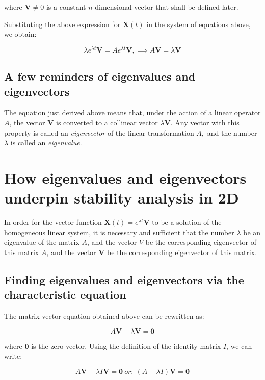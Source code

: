 where $\mathbf{V} \ne 0$ is a constant $n$-dimensional vector that shall be defined later.

Substituting the above expression for $\mathbf{X}(t)$ in the system of equations above, we obtain:

\begin{equation}
	\lambda e^{\lambda t}\mathbf{V} = A e^{\lambda t} \mathbf{V} , \implies A \mathbf{V} = \lambda \mathbf{V}
	\end{equation}

\subsection{A few reminders of eigenvalues and eigenvectors}

The equation just derived above means that, under the action of a linear operator $A$, the vector $\mathbf{V}$ is converted to a collinear vector $\lambda \mathbf{V}$. Any vector with this property is called an \emph{eigenvector} of the linear transformation $A,$ and the number $\lambda$ is called an  \emph{eigenvalue}.

\section{How eigenvalues and eigenvectors underpin stability analysis in 2D}
In order for the vector function $\mathbf{X}(t)=e^{\lambda t}\mathbf{V}$ to be a solution of the homogeneous linear system, it is necessary and sufficient that the number $\lambda$ be an eigenvalue of the matrix $A$, and the vector $V$ be the corresponding eigenvector of this matrix $A$, and the vector $\mathbf{V}$ be the corresponding eigenvector of this matrix.

\subsection{Finding eigenvalues and eigenvectors via the characteristic equation}
The matrix-vector equation obtained above can be rewritten as: 

\begin{equation}
 A \mathbf{V} - \lambda \mathbf{V} = \mathbf{0}
\end{equation}

where $\mathbf{0}$ is the zero vector. Using the definition of the identity matrix $I$, we can write:

\begin{equation}
	A \mathbf{V} - \lambda I \mathbf{V} = \mathbf{0} ~or: ~ (A - \lambda I) \mathbf{V} = \mathbf{0} 
\end{equation}

